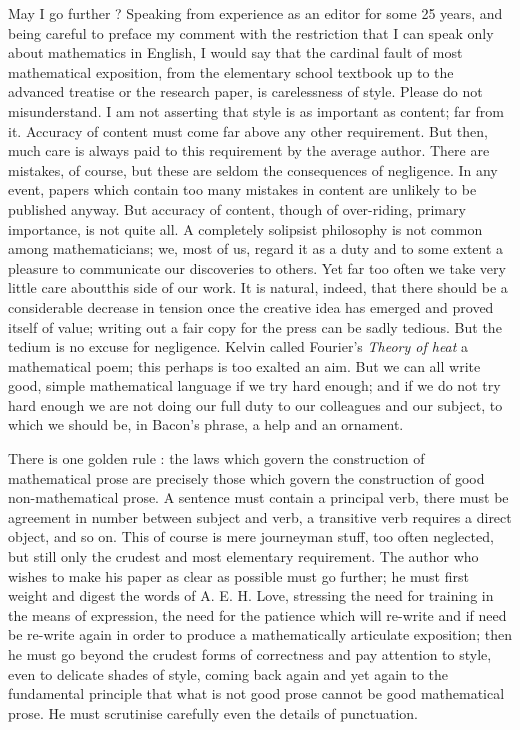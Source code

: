 May I go further ? Speaking from experience as an editor for some 25 years, and being careful to preface my comment with the restriction that I can speak only about mathematics in English, I would say that the cardinal fault of most mathematical exposition, from the elementary school textbook up to the advanced treatise or the research paper, is carelessness of style. Please do not misunderstand. I am not asserting that style is as important as content; far from it. Accuracy of content must come far above any other requirement. But then, much care is always paid to this requirement by the average author. There are mistakes, of course, but these are seldom the consequences of negligence. In any event, papers which contain too many mistakes in content are unlikely to be published anyway. But accuracy of content, though of over-riding, primary importance, is not quite all. A completely solipsist philosophy is not common among mathematicians; we, most of us, regard it as a duty and to some extent a pleasure to communicate our discoveries to others. Yet far too often we take very little care about\pageoriginale this side of our work. It is natural, indeed, that there should be a considerable decrease in tension once the creative idea has emerged and proved itself of value; writing out a fair copy for the press can be sadly tedious. But the tedium is no excuse for negligence. Kelvin called Fourier's {\em Theory of heat} a mathematical poem; this perhaps is too exalted an aim. But we can all write good, simple mathematical language if we try hard enough; and if we do not try hard enough we are not doing our full duty to our colleagues and our subject, to which we should be, in Bacon's phrase, a help and an ornament.

There is one golden rule : the laws which govern the construction of mathematical prose are precisely those which govern the construction of good non-mathematical prose. A sentence must contain a principal verb, there must be agreement in number between subject and verb, a transitive verb requires a direct object, and so on. This of course is mere journeyman stuff, too often neglected, but still only the crudest and most elementary requirement. The author who wishes to make his paper as clear as possible must go further; he must first weight and digest the words of A. E. H. Love, stressing the need for training in the means of expression, the need for the patience which will re-write and if need be re-write again in order to produce a mathematically articulate exposition; then he must go beyond the crudest forms of correctness and pay attention to style, even to delicate shades of style, coming back again and yet again to the fundamental principle that what is not good prose cannot be good mathematical prose. He must scrutinise carefully even the details of punctuation.


